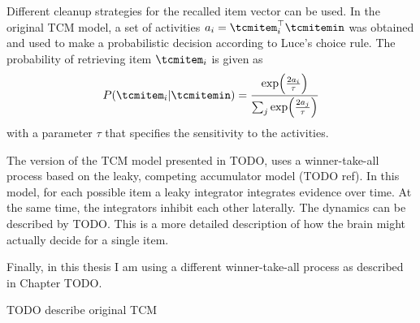 Different cleanup strategies for the recalled item vector can be used.
In the original TCM model, a set of activities $a_i = \tcmitem_i\Tr \tcmitemin$ was obtained and used to make a probabilistic decision according to Luce's choice rule.
The probability of retrieving item $\tcmitem_i$ is given as
\begin{equation}
    P(\tcmitem_i | \tcmitemin) = \frac{\exp\!\del{\frac{2a_i}{\tau}}}{\sum_j \exp\!\del{\frac{2a_j}{\tau}}}
\end{equation}
with a parameter $\tau$ that specifies the sensitivity to the activities.

The version of the TCM model presented in TODO, uses a winner-take-all process based on the leaky, competing accumulator model (TODO ref).
In this model, for each possible item a leaky integrator integrates evidence over time.
At the same time, the integrators inhibit each other laterally.
The dynamics can be described by TODO\@.
This is a more detailed description of how the brain might actually decide for a single item.

Finally, in this thesis I am using a different winner-take-all process as described in Chapter TODO\@.

TODO describe original TCM
